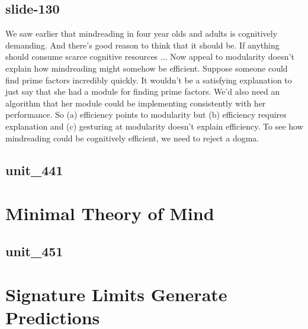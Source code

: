\documentclass[12pt,\papersize]{extarticle}
\begin{document}
 
\subsection{slide-130}
We saw earlier that mindreading in four year olds and adults is cognitively demanding.
And there's good reason to think that it should be.
If anything should consume scarce cognitive resources ...
Now appeal to modularity doesn't explain how mindreading might somehow be efficient.
Suppose someone could find prime factors incredibly quickly.
It wouldn't be a satisfying explanation to just say that she had a module for finding prime factors.
We'd also need an algorithm that her module could be implementing consistently with her performance.
So (a) efficiency points to modularity but (b) efficiency requires explanation and (c) gesturing at modularity doesn't explain efficiency.
To see how mindreading could be cognitively efficient, we need to reject a dogma.
 
 
\subsection{unit\_441}
 
\section{Minimal Theory of Mind}
 
 
\subsection{unit\_451}
 
\section{Signature Limits Generate Predictions}
 
 
\end{document}
